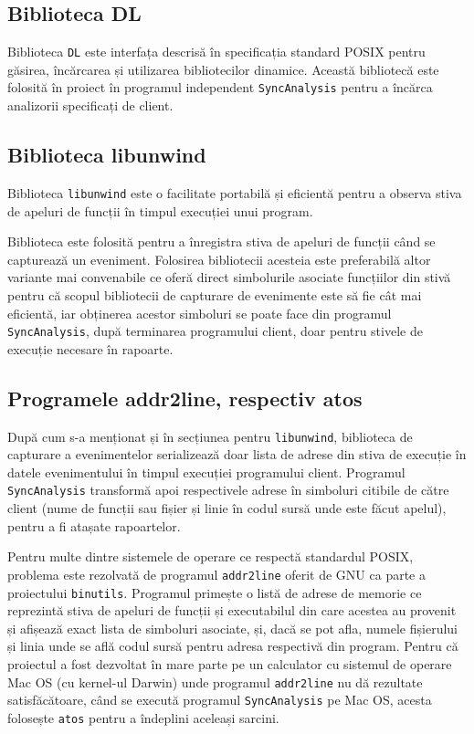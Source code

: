 \subsection{Biblioteca DL}

Biblioteca \lstinline{DL}\cite{DL} este interfața descrisă în
specificația standard POSIX pentru găsirea, încărcarea și utilizarea
bibliotecilor dinamice. Această bibliotecă este folosită în proiect în
programul independent \lstinline{SyncAnalysis} pentru a încărca
analizorii specificați de client.

\subsection{Biblioteca libunwind}

Biblioteca \lstinline{libunwind}\cite{libunwind} este o facilitate
portabilă și eficientă pentru a observa stiva de apeluri de funcții în
timpul execuției unui program.

Biblioteca este folosită pentru a înregistra stiva de apeluri de funcții
când se capturează un eveniment. Folosirea bibliotecii acesteia este
preferabilă altor variante mai convenabile ce oferă direct simbolurile
asociate funcțiilor din stivă pentru că scopul bibliotecii de capturare
de evenimente este să fie cât mai eficientă, iar obținerea acestor
simboluri se poate face din programul \lstinline{SyncAnalysis}, după
terminarea programului client, doar pentru stivele de execuție necesare
în rapoarte.

\subsection{Programele addr2line, respectiv atos}

După cum s-a menționat și în secțiunea pentru \lstinline{libunwind},
biblioteca de capturare a evenimentelor serializează doar lista de
adrese din stiva de execuție în datele evenimentului în timpul execuției
programului client. Programul \lstinline{SyncAnalysis} transformă apoi
respectivele adrese în simboluri citibile de către client (nume de
funcții sau fișier și linie în codul sursă unde este făcut apelul),
pentru a fi atașate rapoartelor.

Pentru multe dintre sistemele de operare ce respectă standardul POSIX,
problema este rezolvată de programul \lstinline{addr2line} oferit de GNU
ca parte a proiectului \lstinline{binutils}\cite{binutils}. Programul
primește o listă de adrese de memorie ce reprezintă stiva de apeluri de
funcții și executabilul din care acestea au provenit și afișează exact
lista de simboluri asociate, și, dacă se pot afla, numele fișierului și
linia unde se află codul sursă pentru adresa respectivă din program.
Pentru că proiectul a fost dezvoltat în mare parte pe un calculator cu
sistemul de operare Mac OS (cu kernel-ul Darwin) unde programul
\lstinline{addr2line} nu dă rezultate satisfăcătoare, când se execută
programul \lstinline{SyncAnalysis} pe Mac OS, acesta folosește
\lstinline{atos}\cite{atos} pentru a îndeplini aceleași sarcini.

